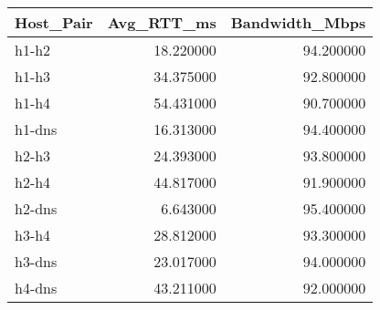 \begin{tabular}{lrr}
\toprule
Host_Pair & Avg_RTT_ms & Bandwidth_Mbps \\
\midrule
h1-h2 & 18.220000 & 94.200000 \\
h1-h3 & 34.375000 & 92.800000 \\
h1-h4 & 54.431000 & 90.700000 \\
h1-dns & 16.313000 & 94.400000 \\
h2-h3 & 24.393000 & 93.800000 \\
h2-h4 & 44.817000 & 91.900000 \\
h2-dns & 6.643000 & 95.400000 \\
h3-h4 & 28.812000 & 93.300000 \\
h3-dns & 23.017000 & 94.000000 \\
h4-dns & 43.211000 & 92.000000 \\
\bottomrule
\end{tabular}
